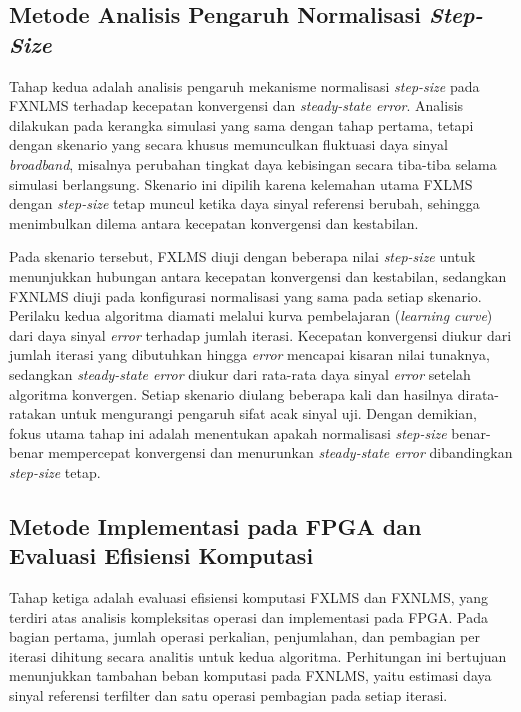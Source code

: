\subsection{Metode Analisis Pengaruh Normalisasi \emph{Step-Size}}
\label{sec:metode_normalisasi}

Tahap kedua adalah analisis pengaruh mekanisme normalisasi \emph{step-size} pada FXNLMS terhadap kecepatan konvergensi dan \emph{steady-state error}. Analisis dilakukan pada kerangka simulasi yang sama dengan tahap pertama, tetapi dengan skenario yang secara khusus memunculkan fluktuasi daya sinyal \emph{broadband}, misalnya perubahan tingkat daya kebisingan secara tiba-tiba selama simulasi berlangsung. Skenario ini dipilih karena kelemahan utama FXLMS dengan \emph{step-size} tetap muncul ketika daya sinyal referensi berubah, sehingga menimbulkan dilema antara kecepatan konvergensi dan kestabilan.

Pada skenario tersebut, FXLMS diuji dengan beberapa nilai \emph{step-size} untuk menunjukkan hubungan antara kecepatan konvergensi dan kestabilan, sedangkan FXNLMS diuji pada konfigurasi normalisasi yang sama pada setiap skenario. Perilaku kedua algoritma diamati melalui kurva pembelajaran (\emph{learning curve}) dari daya sinyal \emph{error} terhadap jumlah iterasi. Kecepatan konvergensi diukur dari jumlah iterasi yang dibutuhkan hingga \emph{error} mencapai kisaran nilai tunaknya, sedangkan \emph{steady-state error} diukur dari rata-rata daya sinyal \emph{error} setelah algoritma konvergen. Setiap skenario diulang beberapa kali dan hasilnya dirata-ratakan untuk mengurangi pengaruh sifat acak sinyal uji. Dengan demikian, fokus utama tahap ini adalah menentukan apakah normalisasi \emph{step-size} benar-benar mempercepat konvergensi dan menurunkan \emph{steady-state error} dibandingkan \emph{step-size} tetap.

\subsection{Metode Implementasi pada FPGA dan Evaluasi Efisiensi Komputasi}
\label{sec:metode_fpga}

Tahap ketiga adalah evaluasi efisiensi komputasi FXLMS dan FXNLMS, yang terdiri atas analisis kompleksitas operasi dan implementasi pada FPGA. Pada bagian pertama, jumlah operasi perkalian, penjumlahan, dan pembagian per iterasi dihitung secara analitis untuk kedua algoritma. Perhitungan ini bertujuan menunjukkan tambahan beban komputasi pada FXNLMS, yaitu estimasi daya sinyal referensi terfilter dan satu operasi pembagian pada setiap iterasi.

